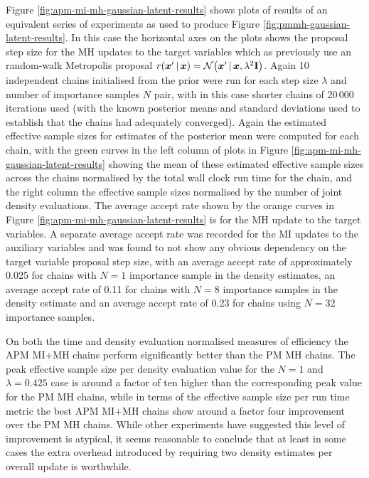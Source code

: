 Figure \ref{fig:apm-mi-mh-gaussian-latent-results} shows plots of results of an equivalent series of experiments as used to produce Figure \ref{fig:pmmh-gaussian-latent-results}. In this case the horizontal axes on the plots shows the proposal step size for the \ac{MH} updates to the target variables which as previously use an random-walk Metropolis proposal $r(\vct{x}'\gvn\vct{x}) = \nrm{\vct{x}'\gvn\vct{x},\lambda^2\mathbf{I}}$. Again 10 independent chains initialised from the prior were run for each step size $\lambda$ and number of importance samples $N$ pair, with in this case shorter chains of 20\,000 iterations used (with the known posterior means and standard deviations used to establish that the chains had adequately converged). Again the estimated effective sample sizes for estimates of the posterior mean were computed for each chain, with the green curves in the left column of plots in Figure \ref{fig:apm-mi-mh-gaussian-latent-results} showing the mean of these estimated effective sample sizes across the chains normalised by the total wall clock run time for the chain, and the right column the effective sample sizes normalised by the number of joint density evaluations. The average accept rate shown by the orange curves in Figure \ref{fig:apm-mi-mh-gaussian-latent-results} is for the \ac{MH} update to the target variables. A separate average accept rate was recorded for the \ac{MI} updates to the auxiliary variables and was found to not show any obvious dependency on the target variable proposal step size, with an average accept rate of approximately 0.025 for chains with $N=1$ importance sample in the density estimates, an average accept rate of 0.11 for chains with $N=8$ importance samples in the density estimate and an average accept rate of 0.23 for chains using $N=32$ importance samples. %

On both the time and density evaluation normalised measures of efficiency the \ac{APM} \ac{MI}+\ac{MH} chains perform significantly better than the \ac{PM} \ac{MH} chains. The peak effective sample size per density evaluation value for the $N=1$ and $\lambda=0.425$ case is around a factor of ten higher than the corresponding peak value for the \ac{PM} \ac{MH} chains, while in terms of the effective sample size per run time metric the best \ac{APM} \ac{MI}+\ac{MH} chains show around a factor four improvement over the \ac{PM} \ac{MH} chains. While other experiments have suggested this level of improvement is atypical, it seems reasonable to conclude that at least in some cases the extra overhead introduced by requiring two density estimates per overall update is worthwhile.

